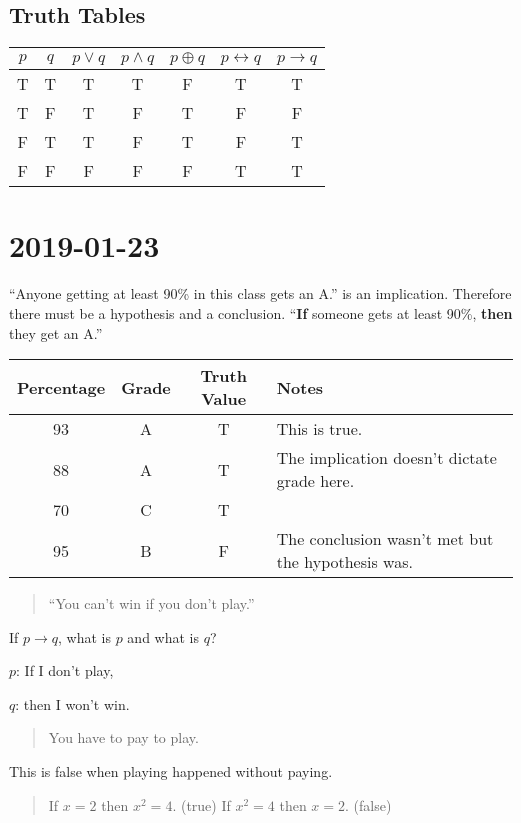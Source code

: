 \documentclass{article}
\theoremstyle{definition}
\begin{document}
\subsection*{Truth Tables}
\begin{tabular}{c | c | c | c | c | c | c}
  $p$ & $q$ & $p \lor q$ & $p \land q$ & $p \oplus q$ & $p \leftrightarrow q$ & $p \rightarrow q$ \\
  \hline
  T & T & T & T & F & T & T \\
  \hline
  T & F & T & F & T & F & F \\
  \hline
  F & T & T & F & T & F & T \\
  \hline
  F & F & F & F & F & T & T
\end{tabular}

\section*{2019-01-23}

``Anyone getting at least 90\% in this class gets an A.'' is an implication. Therefore there must be a hypothesis and a conclusion. ``\textbf{If} someone gets at least 90\%, \textbf{then} they get an A.'' 

\begin{tabular}{c | c | c | l }
  Percentage & Grade & Truth Value & Notes \\
  \hline
  93 & A & T & This is true. \\
  88 & A & T & The implication doesn't dictate grade here. \\
  70 & C & T \\
  95 & B & F & The conclusion wasn't met but the hypothesis was. \\

\end{tabular}

\begin{quote}
``You can't win if you don't play.''
\end{quote}

If $p \rightarrow q$, what is $p$ and what is $q$?

$p$: If I don't play,

$q$: then I won't win.

\begin{quote}
You have to pay to play.
\end{quote}

This is false when playing happened without paying. 

\begin{quote}
  If $x=2$ then $x^2=4$. (true) \newline
  If $x^2=4$ then $x=2$. (false)
\end{quote}
\end{document}
